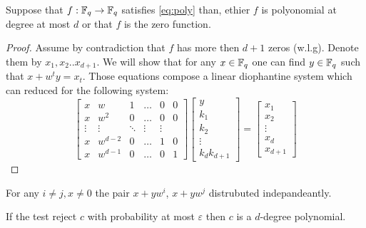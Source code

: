\begin{claim}
  Suppose that $f : \mathbb{F}_{q} \rightarrow \mathbb{F}_{q}$ satisfies \cref{eq:poly} than, ethier $f$ is polyonomial at degree at most $d$ or that $f$ is the zero function.  
\end{claim}
\begin{proof}
  Assume by contradiction that $f$ has more then $d+1$ zeros (w.l.g). Denote them  by $x_{1},x_{2}.. x_{d+1}$. We will show that for any $x \in \mathbb{F}_{q} $ one can find $y \in \mathbb{F}_{q}$ such that $x + w^{t}y =x_{t}$. Those equations compose a linear diophantine system which can reduced for the following system: 
  \begin{equation*}  
\begin{bmatrix}
      x                      &  w                     & 1 &  \dots                   &       0         &       0 \\
      x                       &  w^{2}                & 0     &  \dots                   &       0           &       0  \\
      \vdots                       &  \vdots                    &  \ddots               &  \vdots                &  \vdots  \\
      x                       &  w^{d-2}              & 0    &  \dots                   &       1           &       0  \\
      x                       &  w^{d-1}              & 0 & \dots       &  0     &       1
\end{bmatrix} 
\begin{bmatrix}
  y \\
  k_{1} \\
  k_{2} \\
  \vdots  \\
  k_{d} 
  k_{d+1} 
\end{bmatrix}
= \begin{bmatrix}
  x_{1} \\
  x_{2} \\
  \vdots \\
  x_{d} \\
  x_{d+1}
\end{bmatrix}
  \end{equation*}
\end{proof}


\begin{claim}
For any $i\neq j,x \neq 0 $ the pair $x + yw^{i}$, $x+ yw^{j}$ distrubuted indepandeantly.
\end{claim}

\begin{claim}
  If the test reject $c$ with probability at most $\varepsilon$ then $c$ is a $d$-degree polynomial.
\end{claim}

